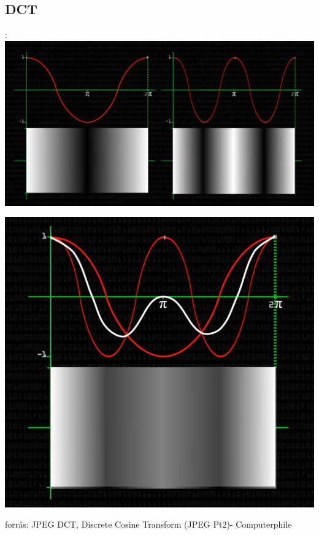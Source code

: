 \documentclass{beamer}
\begin{document}
\subsection{DCT}
\begin{frame}{\secname : \subsecname}
\centering
\includegraphics[scale=0.1]{figures/twocos.png}

\includegraphics[scale=0.15]{figures/cossum.png}

\begin{footnotesize}
    forrás: JPEG DCT, Discrete Cosine Transform (JPEG Pt2)- Computerphile
\end{footnotesize}

\end{frame}
\end{document}
